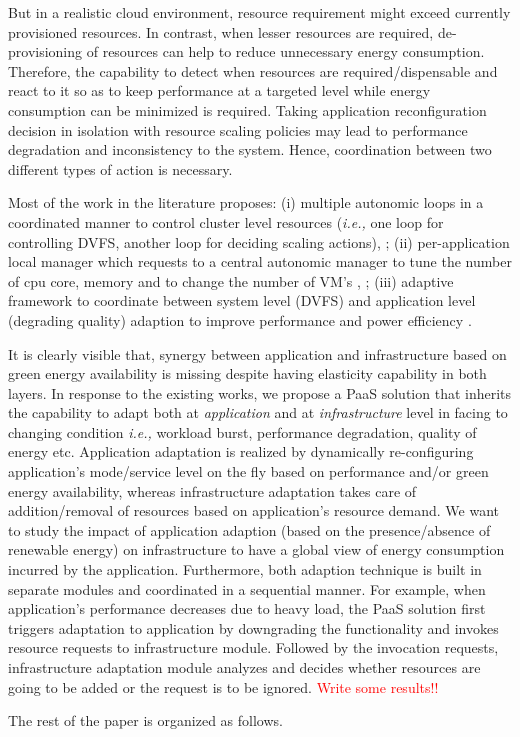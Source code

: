 But in a realistic cloud environment, resource requirement might exceed currently provisioned resources. In contrast, when lesser resources are required, de-provisioning of resources can help to reduce unnecessary energy consumption. Therefore, the capability to detect when resources are required/dispensable and react to it so as to keep performance at a targeted level while energy consumption can be minimized is required. Taking application reconfiguration decision in isolation with resource scaling policies may lead to performance degradation and inconsistency to the system. Hence, coordination between two different types of action is necessary.

Most of the work in the literature proposes: (i) multiple autonomic loops in a coordinated manner to control cluster level resources (\emph{i.e.,} one loop for controlling DVFS, another loop for deciding scaling actions)\cite{server-cluster}, \cite{shi}; (ii) per-application local manager which requests to a central autonomic manager to tune the number of cpu core, memory and to change the number of VM's \cite{morin1}, \cite{morin2}; (iii) adaptive framework to coordinate between system level (DVFS) and application level (degrading quality) adaption to improve performance and power efficiency \cite{adaptcap}.

It is clearly visible that, synergy between application and infrastructure based on green energy availability is missing despite having elasticity capability in both layers. In response to the existing works, we propose a PaaS solution that inherits the capability to adapt both at \emph{application} and at \emph{infrastructure} level in facing to changing condition \emph{i.e.,} workload burst, performance degradation, quality of energy etc. Application adaptation is realized by dynamically re-configuring application's mode/service level on the fly based on performance and/or green energy availability, whereas infrastructure adaptation takes care of addition/removal of resources based on application's resource demand. We want to study the impact of application adaption (based on the presence/absence of renewable energy) on infrastructure to have a global view of energy consumption incurred by the application.
Furthermore, both adaption technique is built in separate modules and coordinated in a sequential manner. For example, when application's performance decreases due to heavy load, the PaaS solution first triggers adaptation to application by downgrading the functionality and invokes resource requests to infrastructure module. Followed by the invocation requests, infrastructure adaptation module analyzes and decides whether resources are going to be added or the request is to be ignored. \textcolor{red}{Write some results!!}


The rest of the paper is organized as follows. 